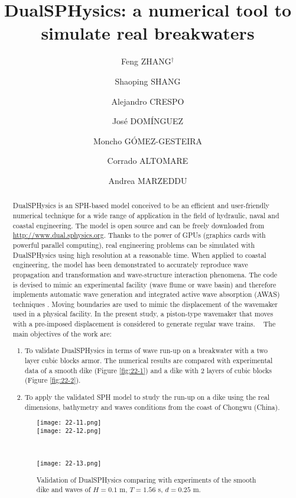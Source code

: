 \documentclass[10pt]{article}
\title{DualSPHysics: a numerical tool to simulate real breakwaters}
\date{}
\author[1]{Feng ZHANG$^\dagger$}
\author[1]{Shaoping SHANG}
\affil[1]{Xiamen University, China}
\author[2]{Alejandro CRESPO}
\author[2]{Jos\'{e} DOM\'{I}NGUEZ}
\author[2]{Moncho G\'{O}MEZ-GESTEIRA}
\affil[2]{Universidade de Vigo, Spain}
\author[3]{Corrado ALTOMARE}
\affil[3]{Flanders Hydraulic Research \& Ghent University, Belgium}
\author[4]{Andrea MARZEDDU}
\affil[4]{Universitat Polit\`{e}cnica de Catalunya, Spain}
\affil[$\relax$]{\email{\dagger}{zhangfeng@stu.xmu.edu.cn}}
\begin{document}
\maketitle


\begin{abstract}
DualSPHysics \cite{crespo2015dualsphysics} is an SPH-based model conceived to be an efficient and user-friendly numerical technique for a wide range of application in the field of hydraulic, naval and coastal engineering. The model is open source and can be freely downloaded from \url{http://www.dual.sphysics.org}. Thanks to the power of GPUs (graphics cards with powerful parallel computing), real engineering problems can be simulated with DualSPHysics using high resolution at a reasonable time. When applied to coastal engineering, the model has been demonstrated to accurately reproduce wave propagation and transformation and wave-structure interaction phenomena. The code is devised to mimic an experimental facility (wave flume or wave basin) and therefore implements automatic wave generation and integrated active wave absorption (AWAS) techniques \cite{altomare2017long}. Moving boundaries are used to mimic the displacement of the wavemaker used in a physical facility. In the present study, a piston-type wavemaker that moves with a pre-imposed displacement is considered to generate regular wave trains.  
The main objectives of the work are:
\begin{enumerate}
\item To validate DualSPHysics in terms of wave run-up on a breakwater with a two layer cubic blocks armor. The numerical results are compared with experimental data of a smooth dike (Figure \ref{fig:22-1}) and a dike with 2 layers of cubic blocks (Figure \ref{fig:22-2}).
\item To apply the validated SPH model to study the run-up on a dike using the real dimensions, bathymetry and waves conditions from the coast of Chongwu (China).
\end{enumerate}

\begin{figure}[!htb]
\begin{minipage}[b]{0.46\linewidth}
\centering
\texttt{[image: 22-11.png]}\\
\texttt{[image: 22-12.png]}
\end{minipage}
\begin{minipage}[b]{0.05\linewidth}
~
\end{minipage}
\begin{minipage}[b]{0.46\linewidth}
\centering
\texttt{[image: 22-13.png]}
\end{minipage}
\caption{Validation of DualSPHysics comparing with experiments of the smooth dike and waves of $H=0.1$ m, $T=1.56$ s, $d=0.25$ m.}\label{fig:22-1}
\end{figure}


\end{abstract}
\end{document}
